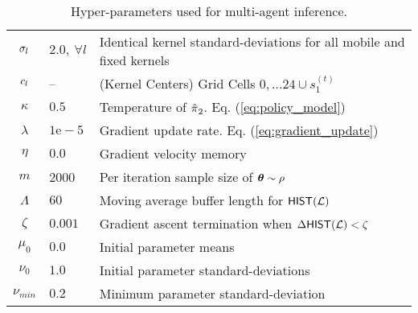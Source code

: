     \begin{table}[H]
	\centering
	\begin{tabular}{c|l l}
		$\sigma_{l}$ & $2.0,\ \forall l$ & Identical kernel standard-deviations for all mobile and fixed kernels\\
		$c_{l}$ & -- & (Kernel Centers) Grid Cells $0,\ldots 24 \cup s_1^{(t)}$\\
		$\kappa$ & $0.5$ & Temperature of $\hat{\pi_{}}_2$. Eq. (\ref{eq:policy_model}) \\
		$\lambda$ & $1\mathrm{e}\!-\!5$ & Gradient update rate. Eq. (\ref{eq:gradient_update}) \\
		$\eta$ & $0.0$ & Gradient velocity memory\\
		$m$ & 2000 & Per iteration sample size of $\boldsymbol{\mathbb{\theta}}\sim \rho$\\
		$\Lambda$ & $60$ & Moving average buffer length for $\mathsf{HIST}(\mathcal{L})$ \\
		$\zeta$ & $0.001$ & Gradient ascent termination when $\Delta\mathsf{HIST}(\mathcal{L}) < \zeta$\\
		$\mu_{0}$ & $0.0$ & Initial parameter means\\
		$\nu_{0}$ & $1.0$ & Initial parameter standard-deviations\\
		$\nu_{min}$ & $0.2$ & Minimum parameter standard-deviation\\
	\end{tabular}
	\caption{Hyper-parameters used for multi-agent inference.}
	\label{table:multi_agent_hyper_params}
\end{table}
	
    \begin{figure}[htb]
	\begin{center}
	\end{center}
\end{figure}


\begin{figure}[htb]
	\begin{center}
	\end{center}
\end{figure}

